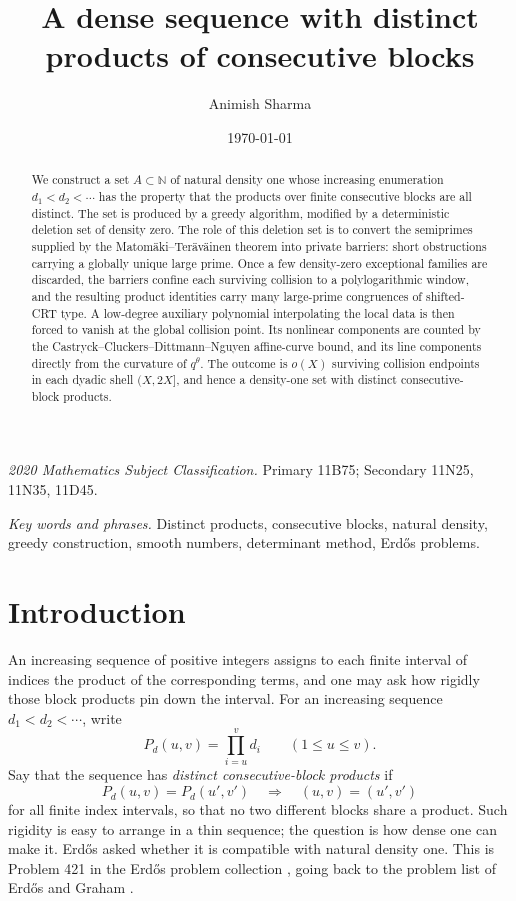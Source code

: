 \documentclass[11pt]{article}
\title{A dense sequence with distinct products of consecutive blocks}
\author{Animish Sharma}
\date{\today}
\theoremstyle{definition}
\newcommand{\N}{\mathbb N}
\newcommand{\1}{\mathbf 1}
\begin{document}
\maketitle

\begin{abstract}
We construct a set \(A\subset\N\) of natural density one whose increasing
enumeration \(d_1<d_2<\cdots\) has the property that the products over finite
consecutive blocks are all distinct.  The set is produced by a greedy
algorithm, modified by a deterministic deletion set of density zero.  The role
of this deletion set is to convert the semiprimes supplied by the
Matom\"aki--Ter\"av\"ainen theorem into private barriers: short obstructions
carrying a globally unique large prime.  Once a few density-zero exceptional
families are discarded, the barriers confine each surviving collision to a
polylogarithmic window, and the resulting product identities carry many
large-prime congruences of shifted-CRT type.  A low-degree auxiliary
polynomial interpolating the local data is then forced to vanish at the global
collision point.  Its nonlinear components are counted by the
Castryck--Cluckers--Dittmann--Nguyen affine-curve bound, and its line
components directly from the curvature of \(q^\theta\).  The outcome is
\(o(X)\) surviving collision endpoints in each dyadic shell \((X,2X]\), and
hence a density-one set with distinct consecutive-block products.
\end{abstract}

\medskip
\noindent\emph{2020 Mathematics Subject Classification.}
Primary 11B75; Secondary 11N25, 11N35, 11D45.

\smallskip
\noindent\emph{Key words and phrases.}
Distinct products, consecutive blocks, natural density, greedy construction,
smooth numbers, determinant method, Erd\H{o}s problems.

\section{Introduction}

An increasing sequence of positive integers assigns to each finite interval of
indices the product of the corresponding terms, and one may ask how rigidly
those block products pin down the interval.  For an increasing sequence
\(d_1<d_2<\cdots\), write
\[
  P_d(u,v)=\prod_{i=u}^v d_i \qquad (1\le u\le v).
\]
Say that the sequence has \emph{distinct consecutive-block products} if
\[
  P_d(u,v)=P_d(u',v') \quad\Longrightarrow\quad (u,v)=(u',v')
\]
for all finite index intervals, so that no two different blocks share a
product.  Such rigidity is easy to arrange in a thin sequence; the question is
how dense one can make it.  Erd\H{o}s asked whether it is compatible with
natural density one.  This is Problem 421 in the Erd\H{o}s problem collection
\cite{Bloom421}, going back to the problem list of Erd\H{o}s and Graham
\cite{ErGr80}.
\end{document}
